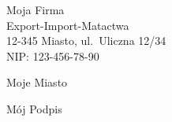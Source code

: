 \sprzedawca Moja Firma\\
	    Export-Import-Matactwa\\
	    12-345 Miasto, ul.~Uliczna 12/34\\
	    NIP: 123-456-78-90

%
%

\def\konto{%
12\thinspace%
0000\thinspace%
1111\thinspace%
0000\thinspace%
1111\thinspace%
1111\thinspace%
0000}



\gdzie Moje Miasto



\mojpodpis Mój Podpis

